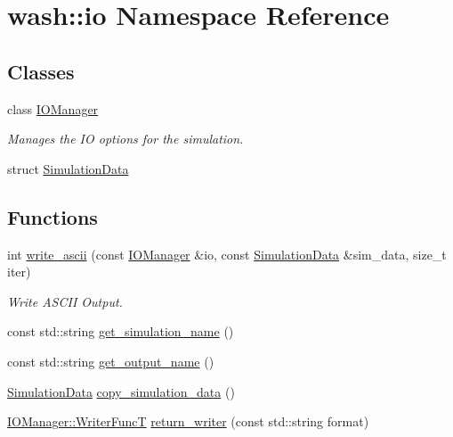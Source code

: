 \hypertarget{namespacewash_1_1io}{}\section{wash\+:\+:io Namespace Reference}
\label{namespacewash_1_1io}
\subsection*{Classes}
\begin{DoxyCompactItemize}
\item 
class \mbox{\hyperlink{classwash_1_1io_1_1IOManager}{I\+O\+Manager}}
\begin{DoxyCompactList}\small\item\em Manages the IO options for the simulation. \end{DoxyCompactList}\item 
struct \mbox{\hyperlink{structwash_1_1io_1_1SimulationData}{Simulation\+Data}}
\end{DoxyCompactItemize}
\subsection*{Functions}
\begin{DoxyCompactItemize}
\item 
int \mbox{\hyperlink{namespacewash_1_1io_ab29d891bfd64999f5ffb3aa5b13c5b22}{write\+\_\+ascii}} (const \mbox{\hyperlink{classwash_1_1io_1_1IOManager}{I\+O\+Manager}} \&io, const \mbox{\hyperlink{structwash_1_1io_1_1SimulationData}{Simulation\+Data}} \&sim\+\_\+data, size\+\_\+t iter)
\begin{DoxyCompactList}\small\item\em Write A\+S\+C\+II Output. \end{DoxyCompactList}\item 
const std\+::string \mbox{\hyperlink{namespacewash_1_1io_a8976ca6dfe3e6332440f2627928db7f9}{get\+\_\+simulation\+\_\+name}} ()
\item 
const std\+::string \mbox{\hyperlink{namespacewash_1_1io_af034a23a15be4666c01bc18c86a45e3e}{get\+\_\+output\+\_\+name}} ()
\item 
\mbox{\hyperlink{structwash_1_1io_1_1SimulationData}{Simulation\+Data}} \mbox{\hyperlink{namespacewash_1_1io_aa9be91ca55f718793aa2e38512d6bdab}{copy\+\_\+simulation\+\_\+data}} ()
\item 
\mbox{\hyperlink{classwash_1_1io_1_1IOManager_aeda8c39a8e3c748efd1b3e0f8ae823ee}{I\+O\+Manager\+::\+Writer\+FuncT}} \mbox{\hyperlink{namespacewash_1_1io_ac3ef6862cb415612f2bd0f102459511e}{return\+\_\+writer}} (const std\+::string format)
\end{DoxyCompactItemize}


